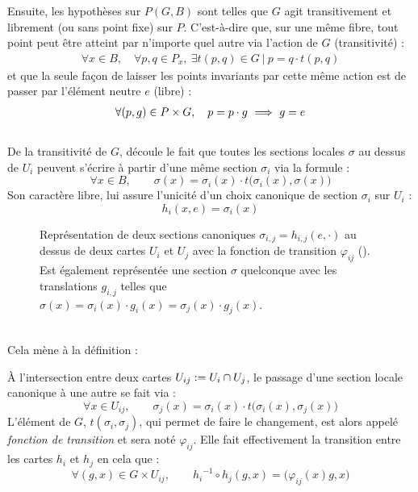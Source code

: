 \noindent
Ensuite, les hypothèses sur $P(G,B)$ sont telles que $G$ agit transitivement et librement (ou sans point fixe) sur $P$. C'est-à-dire que, sur une même fibre, tout point peut être atteint par n'importe quel autre via l'action de $G$ (transitivité) :
\begin{align*}
	\forall x\in B,\quad \forall p,q\in P_x,\ \exists t(p,q)\in G\ |\ p = q\cdot t(p,q) 
\end{align*}
et que la seule façon de laisser les points invariants par cette même action est de passer par l'élément neutre $e$ (libre) :
\begin{align*}
	\forall (p,g)\in P\times G,\quad p = p\cdot g\ \Longrightarrow\ g=e
\end{align*}
\\
De la transitivité de $G$, découle le fait que toutes les sections locales $\sigma$ au dessus de $U_i$ peuvent s'écrire à partir d'une même section $\sigma_i$ via la formule :
\[\forall x\in B,\qquad \sigma(x) = \sigma_i(x) \cdot t\big(\sigma_i(x), \sigma(x)\big)\]
Son caractère libre, lui assure l'unicité d'un choix canonique de section $\sigma_i$ sur $U_i$ : 
\[{h_i}(x,e) = \sigma_i(x)\]
\begin{figure}[h]
	
	\caption[\DONE Représentation de la section canonique]
		{Représentation de deux sections canoniques $\sigma_{i,j}=h_{i,j}(e, \cdot)$ au dessus de deux cartes $U_i$ et $U_j$ avec la fonction de transition $\varphi_{ij}$ (). 
		Est également représentée une section $\sigma$ quelconque avec les translations $g_{i,j}$ telles que $\sigma(x) = \sigma_i(x)\cdot g_i(x) = \sigma_j(x)\cdot g_j(x)$.}
	\label{fig:section_cano}
\end{figure}
\\
Cela mène à la définition :
\begin{definition} \label{def:fonc2transi2VFP}
	À l'intersection entre deux cartes $U_{ij} := U_i\cap U_j$, le passage d'une section locale canonique à une autre se fait via :
	\[\forall x\in U_{ij},\qquad \sigma_j(x) = \sigma_i(x) \cdot t\big(\sigma_i(x), \sigma_j(x)\big)\]
	L'élément de $G$, $t(\sigma_i, \sigma_j)$, qui permet de faire le changement, est alors appelé \emph{fonction de transition} et sera noté $\varphi_{ij}$. Elle fait effectivement la transition entre les cartes $h_i$ et $h_j$ en cela que :
	\[\forall (g,x)\in G\times U_{ij},\qquad {h_i}^{-1} \circ h_j(g,x) = \big( \varphi_{ij}(x)g, x \big)\]
\end{definition}
\skipl




